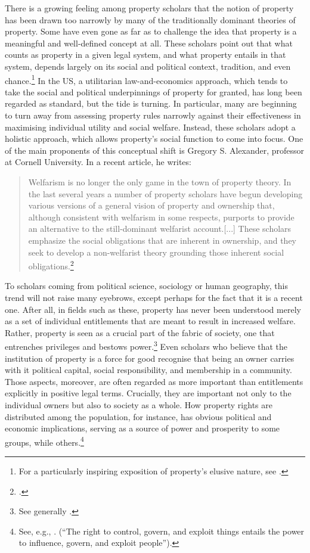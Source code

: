 There is a growing feeling among property scholars that the notion of property has been drawn too narrowly by many of the traditionally dominant theories of property. Some have even gone as far as to challenge the idea that property is a meaningful and well-defined concept at all. These scholars point out that what counts as property in a given legal system, and what property entails in that system, depends largely on its social and political context, tradition, and even chance.\footnote{For a particularly inspiring exposition of property's elusive nature, see \cite{gray91}.} In the US, a utilitarian law-and-economics approach, which tends to take the social and political underpinnings of property for granted, has long been regarded as standard, but the tide is turning. In particular, many are beginning to turn away from assessing property rules narrowly against their effectiveness in maximising individual utility and social welfare. Instead, these scholars adopt a holistic approach, which allows property's social function to come into focus. One of the main proponents of this conceptual shift is Gregory S. Alexander, professor at Cornell University. In a recent article, he writes:

\begin{quote} Welfarism is no longer the only game in the town of property theory. In the last several years a number of property scholars have begun developing various versions of a general vision of property and ownership that, although consistent with welfarism in some respects, purports to provide an alternative to the still-dominant welfarist account.[...] These scholars emphasize the social obligations that are inherent in ownership, and they seek to develop a non-welfarist theory grounding those inherent social obligations.\footcite[1017]{alexander11}
\end{quote}

To scholars coming from political science, sociology or human geography, this trend will not raise many eyebrows, except perhaps for the fact that it is a recent one. After all, in fields such as these, property has never been understood merely as a set of individual entitlements that are meant to result in increased welfare. Rather, property is seen as a crucial part of the fabric of society, one that entrenches privileges and bestows power.\footnote{See generally \cite{carruthers04}.} Even scholars who believe that the institution of property is a force for good recognise that being an owner carries with it political capital, social responsibility, and membership in a community. Those aspects, moreover, are often regarded as more important than entitlements explicitly  in positive legal terms. Crucially, they are important not only to the individual owners but also to society as a whole. How property rights are distributed among the population, for instance, has obvious political and economic implications, serving as a source of power and prosperity to some groups, while  others.\footnote{See, e.g., \cite[23]{carruthers04}. (``The right to control, govern, and exploit things entails the power to influence, govern, and exploit people'').}

